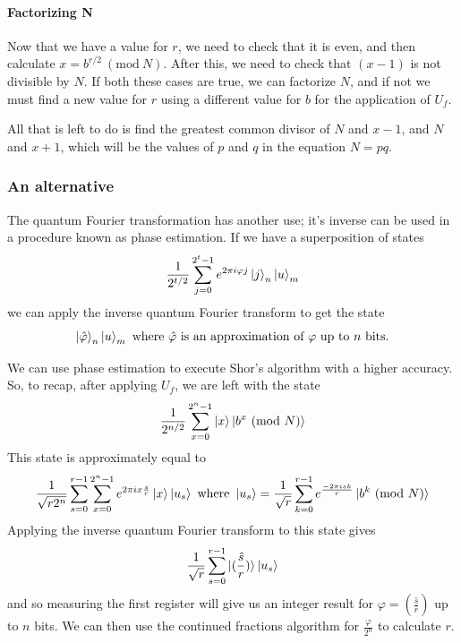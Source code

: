 \documentclass[a4paper,10pt, titlepage, twoside]{article}
\newcommand{\Mod}[1]{\ (\mathrm{mod}\ #1)}
\begin{document}
\paragraph{Factorizing N}
Now that we have a value for $r$, we need to check that it is even, and then calculate $x = b^{r/2} \Mod N$. After this, we need to check that $(x-1)$ is not divisible by $N$. If both these cases are true, we can factorize $N$, and if not we must find a new value for $r$ using a different value for $b$ for the application of $U_f$. \par
All that is left to do is find the greatest common divisor of $N$ and $x-1$, and $N$ and $x+1$, which will be the values of $p$ and $q$ in the equation $N = pq$.

\subsubsection{An alternative}
The quantum Fourier transformation has another use; it's inverse can be used in a procedure known as phase estimation. If we have a superposition of states
$$\frac{1}{2^{t/2}}\sum_{j=0}^{2^t-1}e^{2\pi i \varphi j} \ket j _n \ket u _m$$
we can apply the inverse quantum Fourier transform to get the state
$$\ket {\hat{\varphi}}_n \ket u _m \text{ where  $\hat{\varphi}$ is an approximation of $ \varphi $ up to $n$ bits.}$$\par
We can use phase estimation to execute Shor's algorithm with a higher accuracy. So, to recap, after applying $U_f$, we are left with the state
$$\frac{1}{2^{n/2}} \sum_{x=0}^{2^n -1} \ket x \ket{b^x \Mod N}$$
This state is approximately equal to 
$$\frac{1}{\sqrt{r2^n}}\sum_{s=0}^{r-1} \sum_{x=0}^{2^n-1} e^{2\pi i x \frac{s}{r}} \ket x \ket{u_s} \text{ where } \ket{u_s} = \frac{1}{\sqrt r} \sum_{k=0}^{r-1} e^{\frac{-2\pi isk}{r}} \ket{b^k \Mod N}$$
Applying the inverse quantum Fourier transform to this state gives
$$\frac{1}{\sqrt r}\sum_{s=0}^{r-1} \ket{( \frac{\hat s}{r} )} \ket{u_s}$$
and so measuring the first register will give us an integer result for $\varphi = \left( \frac{\hat s}{r} \right) $ up to $n$ bits. We can then use the continued fractions algorithm for $\frac{\varphi}{2^n}$ to calculate $r$.
\end{document}
